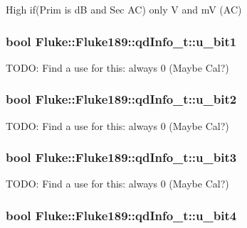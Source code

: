 \label{structFluke_1_1Fluke189_1_1qdInfo__t_aec06148ae228f11298bf487bcabc630c}
High if(Prim is dB and Sec AC) only V and mV (AC) \hypertarget{structFluke_1_1Fluke189_1_1qdInfo__t_a49bb210666c03813d3e2dd5e7739c97f}{
\subsubsection[{u\_\-bit1}]{\setlength{\rightskip}{0pt plus 5cm}bool {\bf Fluke::Fluke189::qdInfo\_\-t::u\_\-bit1}}}
\label{structFluke_1_1Fluke189_1_1qdInfo__t_a49bb210666c03813d3e2dd5e7739c97f}
TODO: Find a use for this: always 0 (Maybe Cal?) \hypertarget{structFluke_1_1Fluke189_1_1qdInfo__t_a3ee66a3c3b07169f2470fc7b8d832601}{
\subsubsection[{u\_\-bit2}]{\setlength{\rightskip}{0pt plus 5cm}bool {\bf Fluke::Fluke189::qdInfo\_\-t::u\_\-bit2}}}
\label{structFluke_1_1Fluke189_1_1qdInfo__t_a3ee66a3c3b07169f2470fc7b8d832601}
TODO: Find a use for this: always 0 (Maybe Cal?) \hypertarget{structFluke_1_1Fluke189_1_1qdInfo__t_a1989b018d05ed21b310846a8cba4099e}{
\subsubsection[{u\_\-bit3}]{\setlength{\rightskip}{0pt plus 5cm}bool {\bf Fluke::Fluke189::qdInfo\_\-t::u\_\-bit3}}}
\label{structFluke_1_1Fluke189_1_1qdInfo__t_a1989b018d05ed21b310846a8cba4099e}
TODO: Find a use for this: always 0 (Maybe Cal?) \hypertarget{structFluke_1_1Fluke189_1_1qdInfo__t_a012174b29b7e6686a724204f63a09c91}{
\subsubsection[{u\_\-bit4}]{\setlength{\rightskip}{0pt plus 5cm}bool {\bf Fluke::Fluke189::qdInfo\_\-t::u\_\-bit4}}}
